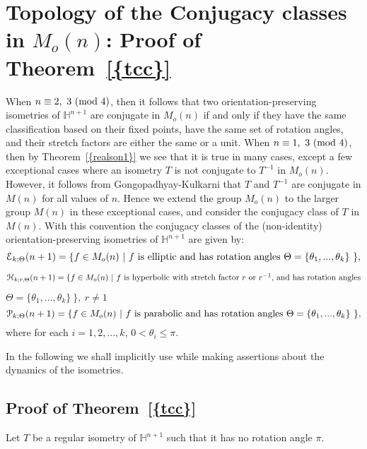 \documentclass[11pt]{amsart}
\theoremstyle{definition}
\theoremstyle{remark}
\numberwithin{equation}{section}
\theoremstyle{plain}
\begin{document}
\section{Topology of the Conjugacy classes in $M_o(n)$: Proof of {Theorem~\ref{{tcc}}}}\label{cc}
When $n \equiv 2, \ 3 \ ( \hbox{mod }4)$, then it follows that two orientation-preserving isometries of ${\mathbb H}^{n+1}$ are conjugate in $M_o(n)$ if and only if they have the same classification based on their fixed points, have the same set of rotation angles, and their stretch factors are either the same or a unit.  When $n \equiv 1, \ 3 \ (\hbox{mod }4)$, then by {Theorem~\ref{{realson1}}} we see that it is true in many cases, except a few exceptional cases where an isometry $T$ is not conjugate to $T^{-1}$ in $M_o(n)$. However, it follows from Gongopadhyay-Kulkarni \cite[Theorem-1.2]{kg} that $T$ and $T^{-1}$ are conjugate in $M(n)$ for all values of $n$. Hence we extend the group $M_o(n)$ to the larger group $M(n)$ in these exceptional cases, and consider the conjugacy class of $T$ in $M(n)$.  With this convention the conjugacy classes of the (non-identity) orientation-preserving isometries of ${\mathbb H}^{n+1}$ are given by: 
$${\mathcal E}_{k; \Theta}(n+1)=\{f \in M_o(n) \ | \  f \hbox{ is elliptic and has rotation angles } \Theta=\{\theta_1,...,\theta_k\} \ \},$$

 ${\mathcal H}_{k; r, \Theta}(n+1)=\{ f \in M_o(n) \ | \ f \hbox{ is hyperbolic with stretch factor $r$ or $r^{-1}$, and has rotation angles}$

 \hspace{2.5in} $\Theta=\{\theta_1,...,\theta_k\} \ \}, \ r \neq 1$
$${\mathcal P}_{k;  \Theta}(n+1)=\{f \in M_o(n) \ | \ f \hbox{ is parabolic and has rotation angles } \Theta=\{\theta_1,...,\theta_k\} \ \},$$
where for each $i=1,2,...,k$, $0 < \theta_i \leq \pi$. 

In the following we shall implicitly use \cite[Theorem-1.1]{kg} while making assertions about the dynamics of the isometries. 

\subsection{Proof of {Theorem~\ref{{tcc}}}} Let $T$ be a regular isometry of ${\mathbb H}^{n+1}$ such that it has no rotation angle $\pi$.  
\end{document}
